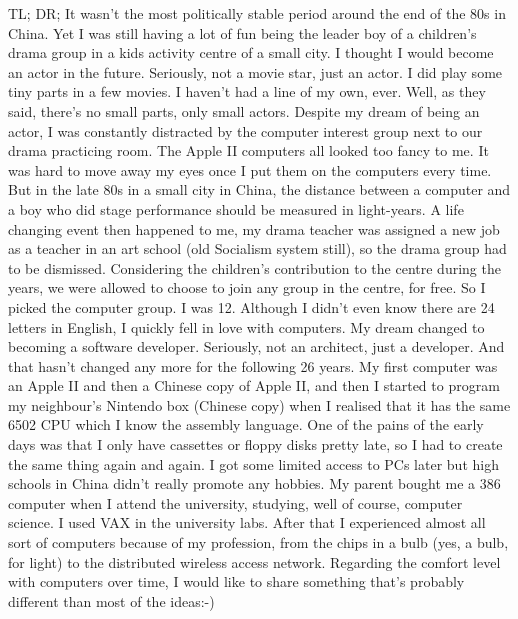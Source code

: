 TL; DR;
It wasn't the most politically stable period around the end of the 80s in China. Yet I was still having a lot of fun being the leader boy of a children's drama group in a kids activity centre of a small city. I thought I would become an actor in the future. Seriously, not a movie star, just an actor. I did play some tiny parts in a few movies. I haven't had a line of my own, ever. Well, as they said, there's no small parts, only small actors.
Despite my dream of being an actor, I was constantly distracted by the computer interest group next to our drama practicing room. The Apple II computers all looked too fancy to me. It was hard to move away my eyes once I put them on the computers every time. But in the late 80s in a small city in China, the distance between a computer and a boy who did stage performance should be measured in light-years.
A life changing event then happened to me, my drama teacher was assigned a new job as a teacher in an art school (old Socialism system still), so the drama group had to be dismissed. Considering the children’s contribution to the centre during the years, we were allowed to choose to join any group in the centre, for free. So I picked the computer group. I was 12.
Although I didn’t even know there are 24 letters in English, I quickly fell in love with computers. My dream changed to becoming a software developer. Seriously, not an architect, just a developer. And that hasn’t changed any more for the following 26 years.
My first computer was an Apple II and then a Chinese copy of Apple II, and then I started to program my neighbour’s Nintendo box (Chinese copy) when I realised that it has the same 6502 CPU which I know the assembly language. One of the pains of the early days was that I only have cassettes or floppy disks pretty late, so I had to create the same thing again and again.
I got some limited access to PCs later but high schools in China didn’t really promote any hobbies. My parent bought me a 386 computer when I attend the university, studying, well of course, computer science. I used VAX in the university labs. After that I experienced almost all sort of computers because of my profession, from the chips in a bulb (yes, a bulb, for light) to the distributed wireless access network.
Regarding the comfort level with computers over time, I would like to share something that’s probably different than most of the ideas:-)
